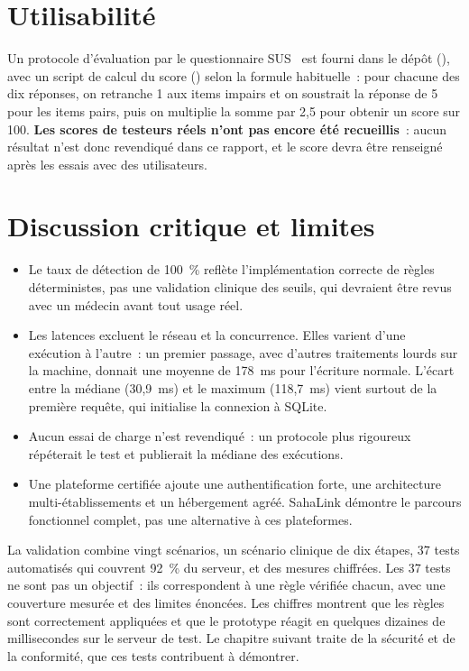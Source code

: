 \section{Utilisabilité}

Un protocole d'évaluation par le questionnaire \ac{SUS}~\cite{brooke1996} est fourni dans le dépôt (), avec un script de calcul du score () selon la formule habituelle~: pour chacune des dix réponses, on retranche 1 aux items impairs et on soustrait la réponse de 5 pour les items pairs, puis on multiplie la somme par 2,5 pour obtenir un score sur 100. \textbf{Les scores de testeurs réels n'ont pas encore été recueillis}~: aucun résultat n'est donc revendiqué dans ce rapport, et le score devra être renseigné après les essais avec des utilisateurs.

\section{Discussion critique et limites}

\begin{itemize}
  \item Le taux de détection de 100~\% reflète l'implémentation correcte de règles déterministes, pas une validation clinique des seuils, qui devraient être revus avec un médecin avant tout usage réel.
  \item Les latences excluent le réseau et la concurrence. Elles varient d'une exécution à l'autre~: un premier passage, avec d'autres traitements lourds sur la machine, donnait une moyenne de 178~ms pour l'écriture normale. L'écart entre la médiane (30,9~ms) et le maximum (118,7~ms) vient surtout de la première requête, qui initialise la connexion à SQLite.
  \item Aucun essai de charge n'est revendiqué~: un protocole plus rigoureux répéterait le test et publierait la médiane des exécutions.
  \item Une plateforme certifiée ajoute une authentification forte, une architecture multi-établissements et un hébergement agréé. SahaLink démontre le parcours fonctionnel complet, pas une alternative à ces plateformes.
\end{itemize}

\conclchap

La validation combine vingt scénarios, un scénario clinique de dix étapes, 37 tests automatisés qui couvrent 92~\% du serveur, et des mesures chiffrées. Les 37 tests ne sont pas un objectif~: ils correspondent à une règle vérifiée chacun, avec une couverture mesurée et des limites énoncées. Les chiffres montrent que les règles sont correctement appliquées et que le prototype réagit en quelques dizaines de millisecondes sur le serveur de test. Le chapitre suivant traite de la sécurité et de la conformité, que ces tests contribuent à démontrer.
